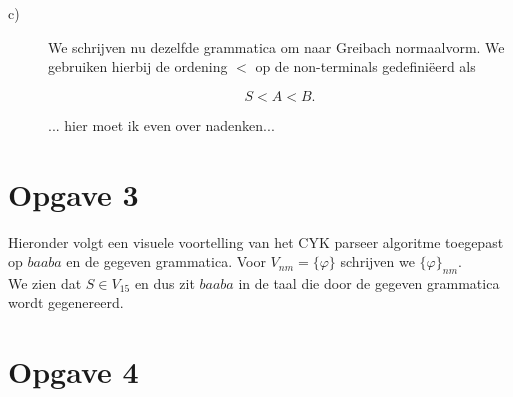 \documentclass[a4paper,11pt]{article}
\begin{document}
\begin{description}
\item[c)]

We schrijven nu dezelfde grammatica om naar Greibach normaalvorm. We gebruiken
hierbij de ordening $<$ op de non-terminals gedefini\"eerd als

\begin{displaymath}
S < A < B \mbox{.}
\end{displaymath}

... hier moet ik even over nadenken...


\end{description}


\section*{Opgave 3}

Hieronder volgt een visuele voortelling van het CYK parseer algoritme
toegepast op $baaba$ en de gegeven grammatica. Voor $V_{nm}=\{\varphi\}$
schrijven we $\{\varphi\}_{nm}$.\\[1em]



We zien dat $S \in V_{15}$ en dus zit $baaba$ in de taal die door de gegeven
grammatica wordt gegenereerd.


\section*{Opgave 4}
\end{document}

